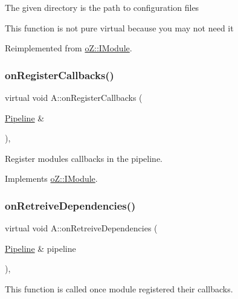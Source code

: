 The given directory is the path to configuration files

This function is not pure virtual because you may not need it 

Reimplemented from \mbox{\hyperlink{classo_z_1_1_i_module_a61a2cc76594401ed2f50931a6a6b76f3}{o\+Z\+::\+I\+Module}}.

\mbox{\label{class_a_ac82f8db798576ee2eff8b6b91b77c239}} 
\subsubsection{\texorpdfstring{onRegisterCallbacks()}{onRegisterCallbacks()}}
{\footnotesize\ttfamily virtual void A\+::on\+Register\+Callbacks (\begin{DoxyParamCaption}\item[{\mbox{\hyperlink{classo_z_1_1_pipeline}{Pipeline}} \&}]{ }\end{DoxyParamCaption})\hspace{0.3cm}{\ttfamily [inline]}, {\ttfamily [virtual]}}



Register module\textquotesingle{}s callbacks in the pipeline. 



Implements \mbox{\hyperlink{classo_z_1_1_i_module_a3dc905faa6df5e22eecc6ffbc923fd95}{o\+Z\+::\+I\+Module}}.

\mbox{\label{class_a_a968473c1dcccfee5502df74229fb263b}} 
\subsubsection{\texorpdfstring{onRetreiveDependencies()}{onRetreiveDependencies()}}
{\footnotesize\ttfamily virtual void A\+::on\+Retreive\+Dependencies (\begin{DoxyParamCaption}\item[{\mbox{\hyperlink{classo_z_1_1_pipeline}{Pipeline}} \&}]{pipeline }\end{DoxyParamCaption})\hspace{0.3cm}{\ttfamily [inline]}, {\ttfamily [virtual]}}



This function is called once module registered their callbacks. 

